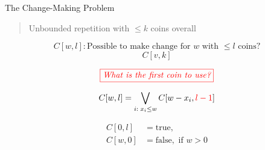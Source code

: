 \begin{frame}{}
  \begin{exampleblock}{The Change-Making Problem}
    \begin{quote}
      \centering
      Unbounded repetition with $\le k$ coins overall
    \end{quote}
  \end{exampleblock}

  \pause
  \[
    C[w,l]: \text{Possible to make change for $w$ with $\le l$ coins?}
  \]
  \[
    C[v,k]
  \]

  \pause
  \[
    \textcolor{red}{\fbox{\it What is the first coin to use?}}
  \]
 
  \pause
  \[
    C[w,l] = \bigvee_{i: \; x_i \le w} C[w-x_i, \textcolor{red}{l-1}]
  \]

  \pause
  \begin{align*}
    C[0,l] &= \text{true}, \\
    C[w,0] &= \text{false}, \text{ if } w > 0
  \end{align*}
\end{frame}
